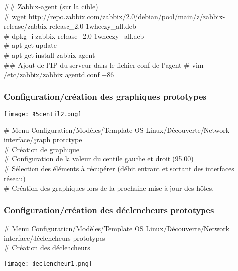 	\#\# Zabbix-agent (sur la cible)\\
	\# wget http://repo.zabbix.com/zabbix/2.0/debian/pool/main/z/zabbix-release/zabbix-release\_2.0-1wheezy\_all.deb \\
	\# dpkg -i zabbix-release\_2.0-1wheezy\_all.deb \\
	\# apt-get update \\
	\# apt-get install zabbix-agent \\
	\#\# Ajout de l'IP du serveur dans le fichier conf de l'agent
	\# vim /etc/zabbix/zabbix agentd.conf +86
		\subsubsection{Configuration/création des graphiques prototypes}

\begin{center}

		\texttt{[image: 95centil2.png]}

		\vspace{0.3cm}

\end{center}

	\# Menu Configuration/Modèles/Template OS Linux/Découverte/Network interface/graph prototype \\
	\# Création de graphique\\
	\# Configuration de la valeur du centile gauche et droit (95.00)\\
	\# Sélection des éléments à récupérer (débit entrant et sortant des interfaces réseau)\\
	\# Création des graphiques lors de la prochaine mise à jour des hôtes. \\

		\subsubsection{Configuration/création des déclencheurs prototypes}
		\vspace{0.3cm}

	\# Menu Configuration/Modèles/Template OS Linux/Découverte/Network interface/déclencheurs prototypes \\
	\# Création des déclencheurs \\


\begin{center}

		\texttt{[image: declencheur1.png]}

		\vspace{0.3cm}

\end{center}

